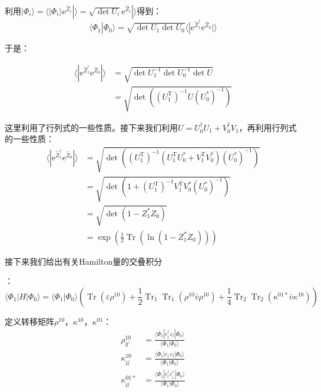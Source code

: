 \begin{booknote*}
利用$|\Phi_{i}\rangle=\langle|\Phi_{i}\rangle\mathrm{e}^{\hat{Z}_{i}}|\rangle=\sqrt{\det U_{i}}\mathrm{e}^{\hat{Z}_{i}}|\rangle$得到：
\[
\langle\Phi_{1}|\Phi_{0}\rangle=\sqrt{\det U_{1}\det U_{0}}\langle|\mathrm{e}^{\hat{Z}^{\dagger}_{1}}\mathrm{e}^{\hat{Z}_{0}}|\rangle
\]

于是：

\begin{align*}
\langle|\mathrm{e}^{\hat{Z}^{\dagger}_{1}}\mathrm{e}^{\hat{Z}_{0}}|\rangle & =\sqrt{\det U^{-1}_{1}\det U^{-1}_{0}\det U}\\
 & =\sqrt{\det((U^{\mathrm{T}}_{1})^{-1}U(U^{*}_{0})^{-1})}
\end{align*}

这里利用了行列式的一些性质。接下来我们利用$U=U^{\dagger}_{0}U_{1}+V^{\dagger}_{0}V_{1}$，再利用行列式的一些性质：
\begin{align*}
\langle|\mathrm{e}^{\hat{Z}^{\dagger}_{1}}\mathrm{e}^{\hat{Z}_{0}}|\rangle & =\sqrt{\det((U^{\mathrm{T}}_{1})^{-1}(U^{\mathrm{T}}_{1}U^{*}_{0}+V^{\mathrm{T}}_{1}V^{*}_{0})(U^{*}_{0})^{-1})}\\
 & =\sqrt{\det(1+(U^{\mathrm{T}}_{1})^{-1}V^{\mathrm{T}}_{1}V^{*}_{0}(U^{*}_{0})^{-1})}\\
 & =\sqrt{\det(1-Z^{*}_{1}Z_{0})}\\
 & =\exp\left(\frac{1}{2}\mathop{\text{Tr}}(\ln(1-Z^{*}_{1}Z_{0}))\right)
\end{align*}
\end{booknote*}
接下来我们给出有关Hamilton量的交叠积分

：
\[
\langle\Phi_{1}|H|\Phi_{0}\rangle=\langle\Phi_{1}|\Phi_{0}\rangle\left(\mathop{\text{Tr}}(\varepsilon\rho^{10})+\frac{1}{2}\mathop{\text{Tr}}_{1}\mathop{\text{Tr}}_{1}(\rho^{10}\bar{v}\rho^{10})+\frac{1}{4}\mathop{\text{Tr}}_{2}\mathop{\text{Tr}}_{2}(\kappa^{01*}\bar{v}\kappa^{10})\right)
\]

定义转移矩阵$\rho^{10}$，$\kappa^{10}$，$\kappa^{01}$：
\begin{align*}
\rho^{10}_{ll^{\prime}} & =\frac{\langle\Phi_{1}|c^{\dagger}_{l^{\prime}}c_{l}|\Phi_{0}\rangle}{\langle\Phi_{1}|\Phi_{0}\rangle}\\
\kappa^{10}_{ll^{\prime}} & =\frac{\langle\Phi_{1}|c_{l^{\prime}}c_{l}|\Phi_{0}\rangle}{\langle\Phi_{1}|\Phi_{0}\rangle}\\
\kappa^{01*}_{ll^{\prime}} & =\frac{\langle\Phi_{1}|c^{\dagger}_{l}c^{\dagger}_{l^{\prime}}|\Phi_{0}\rangle}{\langle\Phi_{1}|\Phi_{0}\rangle}
\end{align*}

